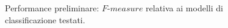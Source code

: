 \documentclass[fleqn,10pt]{SelfArx} %
\begin{document}
\begin{figure}
\caption{\label{prelim_fmeas_leg:fig} Performance preliminare: $F$-$measure$ relativa ai modelli di classificazione testati.}
\end{figure}
\end{document}

